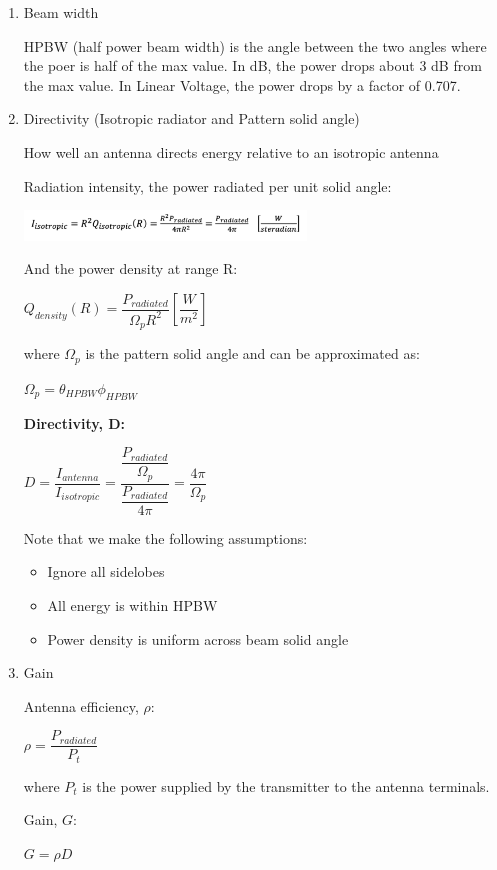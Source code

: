 \documentclass[10pt]{article}
\renewcommand{\frac}{\dfrac}
\begin{document}
\begin{enumerate}
		 
	\item Beam width
	
		HPBW (half power beam width) is the angle between the two angles where the poer is half of the max value. In dB, the power drops about 3 dB from the max value. In Linear Voltage, the power drops by a factor of 0.707.
	
	\item Directivity (Isotropic radiator and Pattern solid angle)
		
		How well an antenna directs energy relative to an isotropic antenna
		
		Radiation intensity, the power radiated per unit solid angle:
		
		\includegraphics[width=0.59\textwidth]{figs/radiationintensity.png}
		
		And the power density at range R:
		
		$Q_{density} (R) = \frac{P_{radiated}}{\Omega_p R^2} [\frac{W}{m^2}]$
		
		where $\Omega_p$ is the pattern solid angle and can be approximated as:
		
		$\Omega_p = \theta_{HPBW} \phi_{HPBW}$
		
		{\bf Directivity, D:}
		
		$D = \frac{I_{antenna}}{I_{isotropic}} = \frac{\frac{P_{radiated}}{\Omega_p}}{\frac{P_{radiated}}{4\pi}} = \frac{4\pi}{\Omega_p}$ 
		
		Note that we make the following assumptions:
		
		\begin{itemize}
			\item Ignore all sidelobes
			\item All energy is within HPBW
			\item Power density is uniform across beam solid angle
		\end{itemize}
		
	\item Gain 
	
	Antenna efficiency, $\rho$: 
		
		$\rho = \frac{P_{radiated}}{P_t}$ 

		where $P_t$ is the power supplied by the transmitter to the antenna terminals.
		
	Gain, $G$:
	
		$G = \rho D$
		


\end{enumerate}
\end{document}
